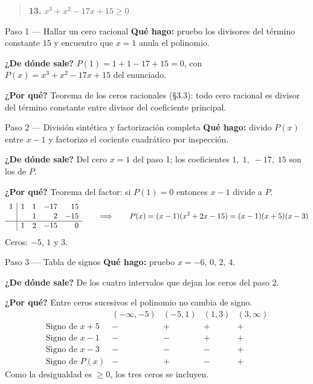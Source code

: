 \documentclass[11pt]{article}
\begin{document}
\begin{quote}
\textbf{13.} $x^3+x^2-17x+15\ge 0$
\end{quote}

\begin{paso}{Paso 1 --- Hallar un cero racional}
\textbf{Qué hago:} pruebo los divisores del término constante $15$ y encuentro que $x=1$ anula el polinomio.

\textbf{¿De dónde sale?} $P(1)=1+1-17+15=0$, con $P(x)=x^3+x^2-17x+15$ del enunciado.

\textbf{¿Por qué?} Teorema de los ceros racionales (§3.3): todo cero racional es divisor del término constante entre divisor del coeficiente principal.
\end{paso}

\begin{paso}{Paso 2 --- División sintética y factorización completa}
\textbf{Qué hago:} divido $P(x)$ entre $x-1$ y factorizo el cociente cuadrático por inspección.

\textbf{¿De dónde sale?} Del cero $x=1$ del paso 1; los coeficientes $1,\;1,\;-17,\;15$ son los de $P$.

\textbf{¿Por qué?} Teorema del factor: si $P(1)=0$ entonces $x-1$ divide a $P$.
\[
\begin{array}{r|rrrr}
1 & 1 & 1 & -17 & 15\\
  &   & 1 & 2 & -15\\\hline
  & 1 & 2 & -15 & 0
\end{array}
\qquad\Longrightarrow\qquad
P(x)=(x-1)(x^2+2x-15)=(x-1)(x+5)(x-3)
\]
Ceros: $-5$, $1$ y $3$.
\end{paso}

\begin{paso}{Paso 3 --- Tabla de signos}
\textbf{Qué hago:} pruebo $x=-6,\,0,\,2,\,4$.

\textbf{¿De dónde sale?} De los cuatro intervalos que dejan los ceros del paso 2.

\textbf{¿Por qué?} Entre ceros sucesivos el polinomio no cambia de signo.
\[
\begin{array}{l|cccc}
 & (-\infty,-5) & (-5,1) & (1,3) & (3,\infty)\\\hline
\text{Signo de } x+5 & - & + & + & +\\
\text{Signo de } x-1 & - & - & + & +\\
\text{Signo de } x-3 & - & - & - & +\\\hline
\text{Signo de } P(x) & - & + & - & +
\end{array}
\]
Como la desigualdad es $\ge 0$, los tres ceros se incluyen.
\end{paso}
\end{document}
